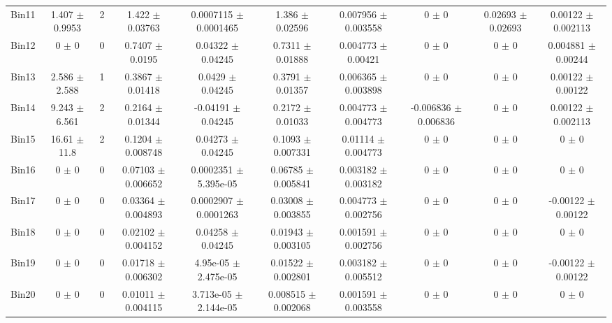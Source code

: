 \begin{tabular}{@{\extracolsep{4pt}}lccccccccc@{}}
     Bin11 & 1.407 $\pm$ 0.9953 & 2 & 1.422 $\pm$ 0.03763 & 0.0007115 $\pm$ 0.0001465 & 1.386 $\pm$ 0.02596 & 0.007956 $\pm$ 0.003558 & 0 $\pm$ 0 & 0.02693 $\pm$ 0.02693 & 0.00122 $\pm$ 0.002113 \\ 
     Bin12 & 0 $\pm$ 0 & 0 & 0.7407 $\pm$ 0.0195 & 0.04322 $\pm$ 0.04245 & 0.7311 $\pm$ 0.01888 & 0.004773 $\pm$ 0.00421 & 0 $\pm$ 0 & 0 $\pm$ 0 & 0.004881 $\pm$ 0.00244 \\ 
     Bin13 & 2.586 $\pm$ 2.588 & 1 & 0.3867 $\pm$ 0.01418 & 0.0429 $\pm$ 0.04245 & 0.3791 $\pm$ 0.01357 & 0.006365 $\pm$ 0.003898 & 0 $\pm$ 0 & 0 $\pm$ 0 & 0.00122 $\pm$ 0.00122 \\ 
     Bin14 & 9.243 $\pm$ 6.561 & 2 & 0.2164 $\pm$ 0.01344 & -0.04191 $\pm$ 0.04245 & 0.2172 $\pm$ 0.01033 & 0.004773 $\pm$ 0.004773 & -0.006836 $\pm$ 0.006836 & 0 $\pm$ 0 & 0.00122 $\pm$ 0.002113 \\ 
     Bin15 & 16.61 $\pm$ 11.8 & 2 & 0.1204 $\pm$ 0.008748 & 0.04273 $\pm$ 0.04245 & 0.1093 $\pm$ 0.007331 & 0.01114 $\pm$ 0.004773 & 0 $\pm$ 0 & 0 $\pm$ 0 & 0 $\pm$ 0 \\ 
     Bin16 & 0 $\pm$ 0 & 0 & 0.07103 $\pm$ 0.006652 & 0.0002351 $\pm$ 5.395e-05 & 0.06785 $\pm$ 0.005841 & 0.003182 $\pm$ 0.003182 & 0 $\pm$ 0 & 0 $\pm$ 0 & 0 $\pm$ 0 \\ 
     Bin17 & 0 $\pm$ 0 & 0 & 0.03364 $\pm$ 0.004893 & 0.0002907 $\pm$ 0.0001263 & 0.03008 $\pm$ 0.003855 & 0.004773 $\pm$ 0.002756 & 0 $\pm$ 0 & 0 $\pm$ 0 & -0.00122 $\pm$ 0.00122 \\ 
     Bin18 & 0 $\pm$ 0 & 0 & 0.02102 $\pm$ 0.004152 & 0.04258 $\pm$ 0.04245 & 0.01943 $\pm$ 0.003105 & 0.001591 $\pm$ 0.002756 & 0 $\pm$ 0 & 0 $\pm$ 0 & 0 $\pm$ 0 \\ 
     Bin19 & 0 $\pm$ 0 & 0 & 0.01718 $\pm$ 0.006302 & 4.95e-05 $\pm$ 2.475e-05 & 0.01522 $\pm$ 0.002801 & 0.003182 $\pm$ 0.005512 & 0 $\pm$ 0 & 0 $\pm$ 0 & -0.00122 $\pm$ 0.00122 \\ 
     Bin20 & 0 $\pm$ 0 & 0 & 0.01011 $\pm$ 0.004115 & 3.713e-05 $\pm$ 2.144e-05 & 0.008515 $\pm$ 0.002068 & 0.001591 $\pm$ 0.003558 & 0 $\pm$ 0 & 0 $\pm$ 0 & 0 $\pm$ 0 \\ 
\hline\hline
  \end{tabular}
